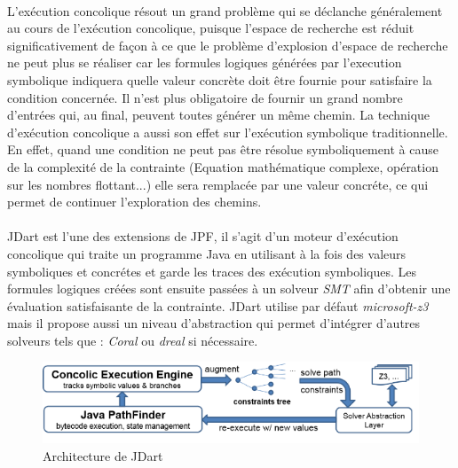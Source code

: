 			\paragraph{}
				L'exécution concolique résout un grand problème qui se déclanche généralement au cours de l'exécution concolique, %
				puisque l'espace de recherche est réduit significativement de façon à ce que le problème d'explosion d'espace de recherche
				ne peut plus se réaliser car les formules logiques générées par l'execution symbolique indiquera quelle valeur concrète
				doit être fournie pour satisfaire la condition concernée.
				Il n'est plus obligatoire de fournir un grand nombre d'entrées qui, au final, peuvent toutes générer un même chemin.
				\newline
				La technique d'exécution concolique a aussi son effet sur l'exécution symbolique traditionnelle.
				En effet, quand une condition ne peut pas être résolue symboliquement à cause de la complexité de la contrainte (Equation mathématique complexe,
				opération sur les nombres flottant...) elle sera remplacée par une valeur concréte, ce qui permet de continuer l'exploration des chemins.

			\paragraph{}
				JDart est l'une des extensions de \gls{JPF}, il s'agit d'un moteur d'exécution concolique qui traite un programme Java
				en utilisant à la fois des valeurs symboliques et concrétes et garde les traces des exécution symboliques.
				Les formules logiques créées sont ensuite passées à un solveur \textit{\gls{SMT}} afin d'obtenir une évaluation satisfaisante de la contrainte.
				JDart utilise par défaut \textit{\gls{microsoft-z3}} mais  il propose aussi un niveau d'abstraction qui permet d'intégrer d'autres solveurs
				tels que : \textit{Coral} ou \textit{dreal} si nécessaire.
				
			\begin{figure}[H]
				\centering
					\includegraphics[scale=0.5]{images/archJDart.png}
				\caption{Architecture de JDart}
			\end{figure}
				
